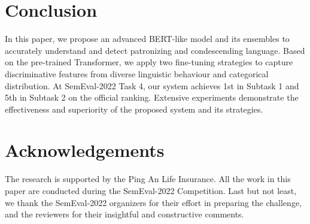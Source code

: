 \documentclass[11pt]{article}
\begin{document}
\section{Conclusion}
In this paper, we propose an advanced BERT-like model and its ensembles to accurately understand and detect patronizing and condescending language. Based on the pre-trained Transformer, we apply two fine-tuning strategies to capture discriminative features from diverse linguistic behaviour and categorical distribution. 
At SemEval-2022 Task 4, our system achieves 1st in Subtask 1 and 5th in Subtask 2 on the official ranking. Extensive experiments demonstrate the effectiveness and superiority of the proposed system and its strategies.



































































\section*{Acknowledgements}
The research is supported by the Ping An Life Insurance. 
All the work in this paper are conducted during the SemEval-2022 Competition.
Last but not least, we thank the SemEval-2022 organizers for their effort in preparing the challenge, and the reviewers for their insightful and constructive comments. 
\end{document}
